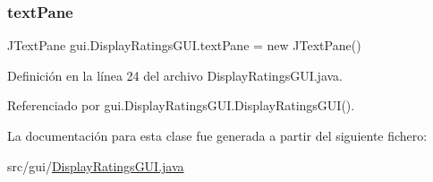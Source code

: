 \subsubsection{\texorpdfstring{textPane}{textPane}}
{\footnotesize\ttfamily J\+Text\+Pane gui.\+Display\+Ratings\+G\+U\+I.\+text\+Pane = new J\+Text\+Pane()\hspace{0.3cm}{\ttfamily [private]}}



Definición en la línea 24 del archivo Display\+Ratings\+G\+U\+I.\+java.



Referenciado por gui.\+Display\+Ratings\+G\+U\+I.\+Display\+Ratings\+G\+U\+I().



La documentación para esta clase fue generada a partir del siguiente fichero\+:\begin{DoxyCompactItemize}
\item 
src/gui/\mbox{\hyperlink{_display_ratings_g_u_i_8java}{Display\+Ratings\+G\+U\+I.\+java}}\end{DoxyCompactItemize}
